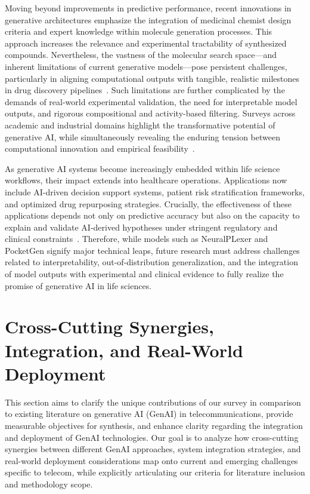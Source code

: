 \documentclass[sigconf]{acmart}
\begin{document}
Moving beyond improvements in predictive performance, recent innovations in generative architectures emphasize the integration of medicinal chemist design criteria and expert knowledge within molecule generation processes. This approach increases the relevance and experimental tractability of synthesized compounds. Nevertheless, the vastness of the molecular search space---and inherent limitations of current generative models---pose persistent challenges, particularly in aligning computational outputs with tangible, realistic milestones in drug discovery pipelines~\cite{ref6}. Such limitations are further complicated by the demands of real-world experimental validation, the need for interpretable model outputs, and rigorous compositional and activity-based filtering. Surveys across academic and industrial domains highlight the transformative potential of generative AI, while simultaneously revealing the enduring tension between computational innovation and empirical feasibility~\cite{ref6,ref26}.

As generative AI systems become increasingly embedded within life science workflows, their impact extends into healthcare operations. Applications now include AI-driven decision support systems, patient risk stratification frameworks, and optimized drug repurposing strategies. Crucially, the effectiveness of these applications depends not only on predictive accuracy but also on the capacity to explain and validate AI-derived hypotheses under stringent regulatory and clinical constraints~\cite{ref26}. Therefore, while models such as NeuralPLexer and PocketGen signify major technical leaps, future research must address challenges related to interpretability, out-of-distribution generalization, and the integration of model outputs with experimental and clinical evidence to fully realize the promise of generative AI in life sciences.

\section{Cross-Cutting Synergies, Integration, and Real-World Deployment}

This section aims to clarify the unique contributions of our survey in comparison to existing literature on generative AI (GenAI) in telecommunications, provide measurable objectives for synthesis, and enhance clarity regarding the integration and deployment of GenAI technologies. Our goal is to analyze how cross-cutting synergies between different GenAI approaches, system integration strategies, and real-world deployment considerations map onto current and emerging challenges specific to telecom, while explicitly articulating our criteria for literature inclusion and methodology scope.
\end{document}
